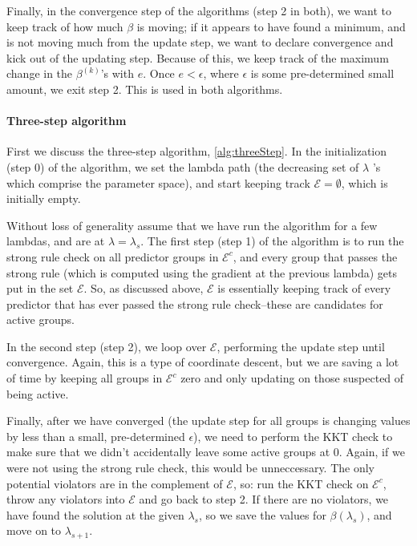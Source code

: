 \documentclass[12pt]{article}
\begin{document}
Finally, in the convergence step of the algorithms (step 2 in both), we want to keep track of how much $\beta$ is moving; if it appears to have found a minimum, and is not moving much from the update step, we want to declare convergence and kick out of the updating step. Because of this, we keep track of the maximum change in the $\beta^{(k)}$'s with $e$. Once $e < \epsilon$, where $\epsilon$ is some pre-determined small amount, we exit step 2. This is used in both algorithms.

\paragraph{Three-step algorithm}

First we discuss the three-step algorithm, \autoref{alg:threeStep}. In the initialization (step 0) of the algorithm, we set the lambda path (the decreasing set of $\lambda$ 's which comprise the parameter space), and start keeping track $\mathcal{E} = \emptyset$, which is initially empty. 

Without loss of generality assume that we have run the algorithm for a few lambdas, and are at $\lambda = \lambda_{s}$. The first step (step 1) of the algorithm is to run the strong rule check on all predictor groups in $\mathcal{E}^c$, and every group that passes the strong rule (which is computed using the gradient at the previous lambda) gets put in the set $\mathcal{E}$. So, as discussed above, $\mathcal{E}$ is essentially keeping track of every predictor that has ever passed the strong rule check--these are candidates for active groups.

In the second step (step 2), we loop over $\mathcal{E}$, performing the update step until convergence. Again, this is a type of coordinate descent, but we are saving a lot of time by keeping all groups in $\mathcal{E}^c$ zero and only updating on those suspected of being active. %

Finally, after we have converged (the update step for all groups is changing values by less than a small, pre-determined $\epsilon$), we need to perform the KKT check to make sure that we didn't accidentally leave some active groups at 0. Again, if we were not using the strong rule check, this would be unneccessary. The only potential violators are in the complement of $\mathcal{E}$, so: run the KKT check on $\mathcal{E}^c$, throw any violators into $\mathcal{E}$ and go back to step 2. If there are no violators, we have found the solution at the given $\lambda_s$, so we save the values for $\beta(\lambda_s)$, and move on to $\lambda_{s+1}$.
\end{document}
